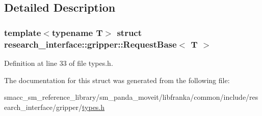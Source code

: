 \subsection{Detailed Description}
\subsubsection*{template$<$typename T$>$\newline
struct research\+\_\+interface\+::gripper\+::\+Request\+Base$<$ T $>$}



Definition at line 33 of file types.\+h.



The documentation for this struct was generated from the following file\+:\begin{DoxyCompactItemize}
\item 
smacc\+\_\+sm\+\_\+reference\+\_\+library/sm\+\_\+panda\+\_\+moveit/libfranka/common/include/research\+\_\+interface/gripper/\hyperlink{types_8h}{types.\+h}\end{DoxyCompactItemize}
